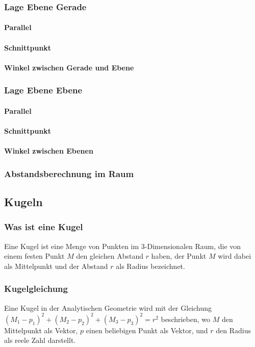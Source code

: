 \documentclass[a4paper]{article} %
\begin{document}
	\subsubsection{Lage Ebene Gerade}
	\paragraph{Parallel}
	\paragraph{Schnittpunkt}
	\paragraph{Winkel zwischen Gerade und Ebene}
	\subsubsection{Lage Ebene Ebene}
	\paragraph{Parallel}
	\paragraph{Schnittpunkt}
	\paragraph{Winkel zwischen Ebenen}
	\subsubsection{Abstandsberechnung im Raum}
	\subsection{Kugeln}
	\subsubsection{Was ist eine Kugel}
	Eine Kugel ist eine Menge von Punkten im 3-Dimensionalen Raum, die von einem festen Punkt $M$ den gleichen Abstand $r$ haben,
	der Punkt $M$ wird dabei als Mittelpunkt und der Abstand $r$ als Radius bezeichnet.
	\subsubsection{Kugelgleichung}
	Eine Kugel in der Analytischen Geometrie wird mit der Gleichung\\
	$(M_1-p_1)^2+(M_2-p_2)^2+(M_3-p_3)^2=r^2$ beschrieben, wo $M$ den Mittelpunkt als Vektor, $p$ einen beliebigen Punkt als Vektor, und $r$ den Radius als reele Zahl darstellt.
\end{document}
